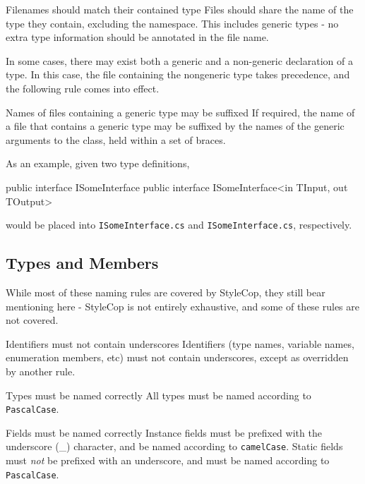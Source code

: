 \documentclass[11pt,a4paper]{article}
\newcounter{rule}[section]
\begin{document}
\begin{should}{Filenames should match their contained type}
Files should share the name of the type they contain, excluding the namespace. This includes generic types - no extra type information should be annotated in the file name.
\end{should}

In some cases, there may exist both a generic and a non-generic declaration of a type. In this case, the file containing the nongeneric type takes precedence, and the following rule comes into effect.

\begin{may}{Names of files containing a generic type may be suffixed}
If required, the name of a file that contains a generic type may be suffixed by the names of the generic arguments to the class, held within a set of braces.
\end{may}

As an example, given two type definitions,

\begin{code}
public interface ISomeInterface { }
public interface ISomeInterface<in TInput, out TOutput> { }
\end{code}

would be placed into \texttt{ISomeInterface.cs} and \texttt{ISomeInterface.cs}, respectively.

\subsection{Types and Members}
While most of these naming rules are covered by StyleCop, they still bear mentioning here - StyleCop is not entirely exhaustive, and some of these rules are not covered.

\begin{must}{Identifiers must not contain underscores}
Identifiers (type names, variable names, enumeration members, etc) must not contain underscores, except as overridden by another rule.
\end{must}

\begin{must}{Types must be named correctly}
All types must be named according to \texttt{PascalCase}.
\end{must}

\begin{must}{Fields must be named correctly}
Instance fields must be prefixed with the underscore (\_) character, and be named according to \texttt{camelCase}.
Static fields must \textit{not} be prefixed with an underscore, and must be named according to \texttt{PascalCase}.
\end{must}
\end{document}
